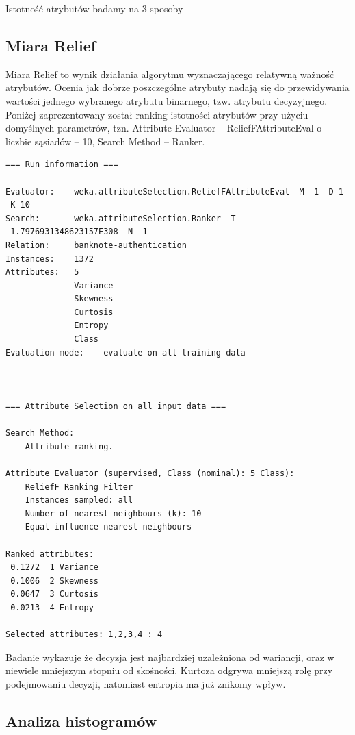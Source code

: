 \documentclass{classrep}
\begin{document}
Istotność atrybutów badamy na 3 sposoby
\subsection{Miara Relief}
Miara Relief to wynik działania algorytmu wyznaczającego relatywną ważność atrybutów. Ocenia jak dobrze poszczególne atrybuty nadają się do przewidywania wartości jednego wybranego atrybutu binarnego, tzw. atrybutu decyzyjnego. Poniżej zaprezentowany został ranking istotności atrybutów przy użyciu domyślnych parametrów, tzn. Attribute Evaluator – ReliefFAttributeEval o liczbie sąsiadów – 10, Search Method – Ranker. 

\scriptsize
\begin{verbatim}
=== Run information ===

Evaluator:    weka.attributeSelection.ReliefFAttributeEval -M -1 -D 1 -K 10
Search:       weka.attributeSelection.Ranker -T -1.7976931348623157E308 -N -1
Relation:     banknote-authentication
Instances:    1372
Attributes:   5
              Variance
              Skewness
              Curtosis
              Entropy
              Class
Evaluation mode:    evaluate on all training data



=== Attribute Selection on all input data ===

Search Method:
	Attribute ranking.

Attribute Evaluator (supervised, Class (nominal): 5 Class):
	ReliefF Ranking Filter
	Instances sampled: all
	Number of nearest neighbours (k): 10
	Equal influence nearest neighbours

Ranked attributes:
 0.1272  1 Variance
 0.1006  2 Skewness
 0.0647  3 Curtosis
 0.0213  4 Entropy

Selected attributes: 1,2,3,4 : 4

\end{verbatim}
\normalsize

Badanie wykazuje że decyzja jest najbardziej uzależniona od wariancji, oraz w niewiele mniejszym stopniu od skośności. Kurtoza odgrywa mniejszą rolę przy podejmowaniu decyzji, natomiast entropia ma już znikomy wpływ.

\subsection{Analiza histogramów}
\end{document}
